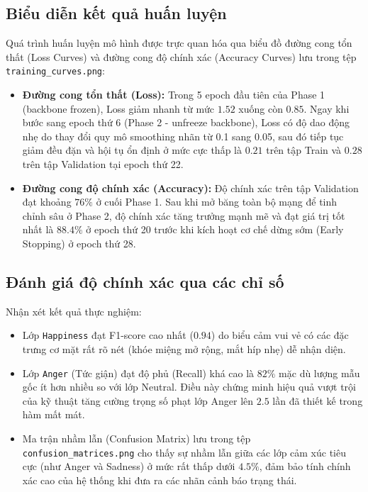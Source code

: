 \documentclass[../DoAn.tex]{subfiles}
\begin{document}
\subsection{Biểu diễn kết quả huấn luyện}
Quá trình huấn luyện mô hình được trực quan hóa qua biểu đồ đường cong tổn thất (Loss Curves) và đường cong độ chính xác (Accuracy Curves) lưu trong tệp \texttt{training\_curves.png}:
\begin{itemize}
    \item \textbf{Đường cong tổn thất (Loss):} Trong 5 epoch đầu tiên của Phase 1 (backbone frozen), Loss giảm nhanh từ mức $1.52$ xuống còn $0.85$. Ngay khi bước sang epoch thứ 6 (Phase 2 - unfreeze backbone), Loss có độ dao động nhẹ do thay đổi quy mô smoothing nhãn từ 0.1 sang 0.05, sau đó tiếp tục giảm đều đặn và hội tụ ổn định ở mức cực thấp là $0.21$ trên tập Train và $0.28$ trên tập Validation tại epoch thứ 22.
    \item \textbf{Đường cong độ chính xác (Accuracy):} Độ chính xác trên tập Validation đạt khoảng $76\%$ ở cuối Phase 1. Sau khi mở băng toàn bộ mạng để tinh chỉnh sâu ở Phase 2, độ chính xác tăng trưởng mạnh mẽ và đạt giá trị tốt nhất là \textbf{$88.4\%$} ở epoch thứ 20 trước khi kích hoạt cơ chế dừng sớm (Early Stopping) ở epoch thứ 28.
\end{itemize}

\subsection{Đánh giá độ chính xác qua các chỉ số}
Nhận xét kết quả thực nghiệm:
\begin{itemize}
    \item Lớp \texttt{Happiness} đạt F1-score cao nhất ($0.94$) do biểu cảm vui vẻ có các đặc trưng cơ mặt rất rõ nét (khóe miệng mở rộng, mắt híp nhẹ) dễ nhận diện.
    \item Lớp \texttt{Anger} (Tức giận) đạt độ phủ (Recall) khá cao là $82\%$ mặc dù lượng mẫu gốc ít hơn nhiều so với lớp Neutral. Điều này chứng minh hiệu quả vượt trội của kỹ thuật tăng cường trọng số phạt lớp Anger lên $2.5$ lần đã thiết kế trong hàm mất mát.
    \item Ma trận nhầm lẫn (Confusion Matrix) lưu trong tệp \texttt{confusion\_matrices.png} cho thấy sự nhầm lẫn giữa các lớp cảm xúc tiêu cực (như Anger và Sadness) ở mức rất thấp dưới $4.5\%$, đảm bảo tính chính xác cao của hệ thống khi đưa ra các nhãn cảnh báo trạng thái.
\end{itemize}
\end{document}
